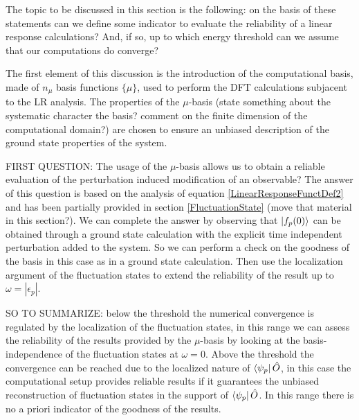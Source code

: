 \documentclass[reprint,aps,prb]{revtex4-1}
\newcommand{\eps}{\epsilon}
\newcommand{\op}[1]{\hat {#1}}
\begin{document}
The topic to be discussed in this section is the following: on the basis of these statements can we define some indicator to evaluate the reliability of a linear response calculations? And, 
if so, up to which energy threshold can we assume that our computations do converge?

The first element of this discussion is the introduction of the computational basis, made of $n_\mu$ basis functions $\{\mu\}$, used to perform the DFT calculations subjacent to the LR analysis. 
The properties of the $\mu$-basis (state something about the systematic character the basis? comment on the finite dimension of the computational domain?) are chosen to ensure an unbiased description 
of the ground state properties of the system. 

FIRST QUESTION: The usage of the $\mu$-basis allows us to obtain a reliable evaluation of the perturbation induced modification of an observable? 
The answer of this question is based on the analysis of equation \eqref{LinearResponseFunctDef2} and has been partially provided in section \ref{FluctuationState} (move that material in this section?). 
We can complete the answer by observing that $\ket{f_p(0)}$ can be obtained through a ground state calculation with the explicit time independent perturbation added to the system. So we can perform
a check on the goodness of the basis in this case as in a ground state calculation. Then use the localization argument of the fluctuation states to extend the reliability of the result up to
$\omega=|\eps_p|$. 

SO TO SUMMARIZE: below the threshold the numerical convergence is regulated by the localization of the fluctuation states, in this range we can assess the reliability of the results provided by
the $\mu$-basis by looking at the basis-independence of the fluctuation states at $\omega=0$. Above the threshold the convergence can be reached due to the localized nature of $\bra{\psi_p}\op O$, 
in this case the computational setup provides reliable results if it guarantees the unbiased reconstruction of fluctuation states in the support of $\bra{\psi_p}\op O$. In this range there is no a 
priori indicator of the goodness of the results. 
\end{document}
